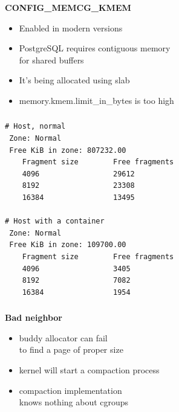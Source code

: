 \documentclass[usenames,dvipsnames, 18pt, compress, aspectratio=169]{beamer}
\begin{document}
\begin{frame}
    \frametitle{}
    \begin{center}
    \textbf{CONFIG\_MEMCG\_KMEM}

        \begin{itemize}[label={\MVRightarrow}]
            \item Enabled in modern versions
            \item PostgreSQL requires contiguous memory \\ for shared buffers
            \item It's being allocated using slab
            \item memory.kmem.limit\_in\_bytes is too high
        \end{itemize}

    \end{center}
\end{frame}

\begin{frame}[fragile]{}
    \frametitle{}
    \begin{center}

        \begin{verbatim}
# Host, normal
 Zone: Normal
 Free KiB in zone: 807232.00
    Fragment size        Free fragments
    4096                 29612
    8192                 23308
    16384                13495

# Host with a container
 Zone: Normal
 Free KiB in zone: 109700.00
    Fragment size        Free fragments
    4096                 3405
    8192                 7082
    16384                1954
        \end{verbatim}

    \end{center}
\end{frame}

\begin{frame}
    \frametitle{}
    \begin{center}
    \textbf{Bad neighbor}

        \begin{itemize}[label={\MVRightarrow}]
            \item buddy allocator can fail \\ to find a page of proper size
            \item kernel will start a compaction process
            \item compaction implementation \\ knows nothing about cgroups
        \end{itemize}

    \end{center}
\end{frame}
\end{document}
